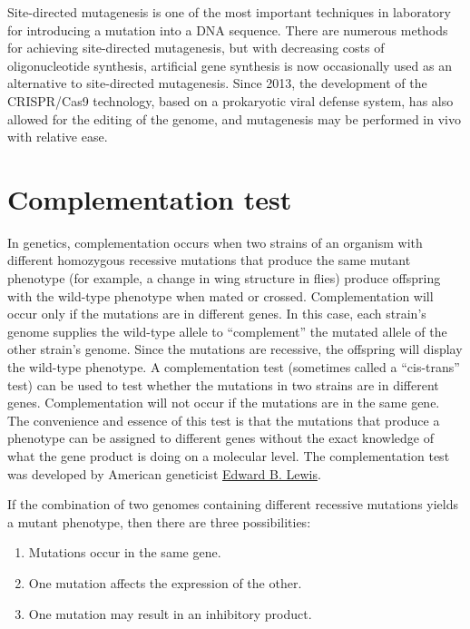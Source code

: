 Site-directed mutagenesis is one of the most important techniques in laboratory for introducing a mutation into a DNA sequence. There are numerous methods for achieving site-directed mutagenesis, but with decreasing costs of oligonucleotide synthesis, artificial gene synthesis is now occasionally used as an alternative to site-directed mutagenesis. Since 2013, the development of the CRISPR/Cas9 technology, based on a prokaryotic viral defense system, has also allowed for the editing of the genome, and mutagenesis may be performed in vivo with relative ease.

\hypertarget{complementation-test}{%
\section{Complementation test}\label{complementation-test}}

In genetics, complementation occurs when two strains of an organism with different homozygous recessive mutations that produce the same mutant phenotype (for example, a change in wing structure in flies) produce offspring with the wild-type phenotype when mated or crossed. Complementation will occur only if the mutations are in different genes. In this case, each strain's genome supplies the wild-type allele to ``complement'' the mutated allele of the other strain's genome. Since the mutations are recessive, the offspring will display the wild-type phenotype. A complementation test (sometimes called a ``cis-trans'' test) can be used to test whether the mutations in two strains are in different genes. Complementation will not occur if the mutations are in the same gene. The convenience and essence of this test is that the mutations that produce a phenotype can be assigned to different genes without the exact knowledge of what the gene product is doing on a molecular level. The complementation test was developed by American geneticist \href{https://en.wikipedia.org/wiki/Edward_B._Lewis}{Edward B. Lewis}.

If the combination of two genomes containing different recessive mutations yields a mutant phenotype, then there are three possibilities:

\begin{enumerate}
\def\labelenumi{\arabic{enumi}.}
\tightlist
\item
  Mutations occur in the same gene.
\item
  One mutation affects the expression of the other.
\item
  One mutation may result in an inhibitory product.
\end{enumerate}

